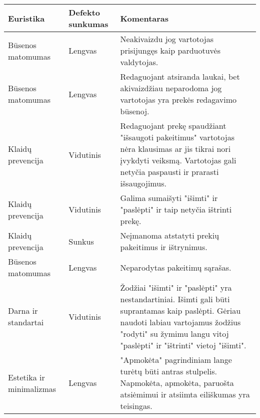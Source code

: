 \documentclass[oneside]{VUMIFPSkursinis}
\begin{document}
\begin{center}
	\begin{tabular}{ |p{3cm}| p{3cm} | p{11cm} | }
			\hline
			Euristika                    & Defekto sunkumas & Komentaras \\ \hline
			Būsenos matomumas            & Lengvas          &
				Neakivaizdu jog vartotojas prisijungęs kaip parduotuvės valdytojas.
				\\ \hline
			Būsenos matomumas            & Lengvas          &
				Redaguojant atsiranda laukai, bet akivaizdžiau neparodoma jog vartotojas yra prekės redagavimo būsenoj.
				\\ \hline
			Klaidų prevencija            & Vidutinis        &
				Redaguojant prekę spaudžiant "išsaugoti pakeitimus" vartotojas nėra klausimas ar jis tikrai nori įvykdyti veiksmą.
				Vartotojas gali netyčia paspausti ir prarasti išsaugojimus.
				\\ \hline
			Klaidų prevencija            & Vidutinis        &
				Galima sumaišyti "išimti" ir "paslėpti" ir taip netyčia ištrinti prekę.
				\\ \hline
			Klaidų prevencija            & Sunkus           &
				Neįmanoma atstatyti prekių pakeitimus ir ištrynimus.
				\\ \hline
			Būsenos matomumas            & Lengvas          &
				Neparodytas pakeitimų sąrašas.
				\\ \hline
			Darna ir standartai          & Vidutinis        &
				Žodžiai "išimti" ir "paslėpti" yra nestandartiniai.
				Išimti gali būti suprantamas kaip paslėpti.
				Gėriau naudoti labiau vartojamus žodžius "rodyti" su žymimu langu vitoj "paslėpti" ir "ištrinti" vietoj "išimti".
				\\ \hline
			Estetika ir minimalizmas     & Lengvas          &
				"Apmokėta" pagrindiniam lange turėtų būti antras stulpelis.
				Napmokėta, apmokėta, paruošta atsiėmimui ir atsiimta eiliškumas yra teisingas.
				\\ \hline
	\end{tabular}
\end{center}
\pagebreak
\end{document}
